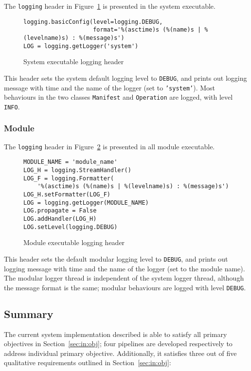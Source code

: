 The \texttt{logging} header in Figure~\ref{log-sys} is presented in the
system executable.

\begin{figure}[ht]
\begin{lstlisting}
logging.basicConfig(level=logging.DEBUG,
                    format='%(asctime)s (%(name)s | %(levelname)s) : %(message)s')
LOG = logging.getLogger('system')
\end{lstlisting}
\caption{System executable logging header}\label{log-sys}
\end{figure}

This header sets the system default logging level to \texttt{DEBUG}, and prints
out logging message with time and the name of the logger (set to \texttt{'system'}).
Most behaviours in the two classes \texttt{Manifest} and \texttt{Operation} are
logged, with level \texttt{INFO}.

\subsubsection{Module}

The \texttt{logging} header in Figure~\ref{log-mod} is presented in all
module executable.

\begin{figure}[ht]
\begin{lstlisting}
MODULE_NAME = 'module_name'
LOG_H = logging.StreamHandler()
LOG_F = logging.Formatter(
    '%(asctime)s (%(name)s | %(levelname)s) : %(message)s')
LOG_H.setFormatter(LOG_F)
LOG = logging.getLogger(MODULE_NAME)
LOG.propagate = False
LOG.addHandler(LOG_H)
LOG.setLevel(logging.DEBUG)
\end{lstlisting}
\caption{Module executable logging header}\label{log-mod}
\end{figure}

This header sets the default modular logging level to \texttt{DEBUG}, and prints
out logging message with time and the name of the logger (set to the module name).
The modular logger thread is independent of the system logger thread, although
the message format is the same; modular behaviours are logged with level
\texttt{DEBUG}.

\subsection{Summary}\label{sec:im:code:summ}

The current system implementation described is able to satisfy all primary
objectives in Section~\ref{sec:in:obj}; four pipelines are developed respectively
to address individual primary objective. Additionally, it satisfies three out of
five qualitative requirements outlined in Section~\ref{sec:in:obj}:

